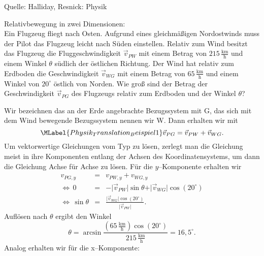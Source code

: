 \begin{MExercises}
\begin{MExercise}
\begin{enumerate}
\begin{MSolution}
      \end{MSolution}
      \end{enumerate}
      
      Quelle: Halliday, Resnick: Physik
      \end{MExercise}
      \clearpage
      
      
     \begin{MExercise} Relativbewegung in zwei Dimensionen:\\
     Ein Flugzeug fliegt nach Osten. Aufgrund eines gleichm\"a{\ss}igen Nordostwinds muss der Pilot das Flugzeug leicht nach S\"uden einstellen. Relativ zum Wind besitzt das Flugzeug die Fluggeschwindigkeit $\vec{v}_{PW}$ mit einem Betrag von $215 \,\frac{\text{km}}{\text{h}}$ und einem Winkel $\theta$ s\"udlich der \"ostlichen Richtung. Der Wind hat relativ zum Erdboden die Geschwindigkeit 
     $\vec{v}_{WG}$ mit einem Betrag von $65 \,\frac{\text{km}}{\text{h}}$ und einem Winkel von $20^{\circ}$ \"ostlich von Norden. Wie gro{\ss} sind der Betrag der Geschwindigkeit $\vec{v}_{PG}$ des Flugzeugs relativ zum Erdboden und der Winkel $\theta$?
     
     
     \begin{MSolution}  Wir bezeichnen das an der Erde angebrachte Bezugssystem mit G, das sich mit dem Wind bewegende Bezugssystem nennen wir W. Dann erhalten wir mit  
     \begin{equation}\MLabel{Physik_Translation_Beispiel1}
     \vec{v}_{PG}=\vec{v}_{PW}+\vec{v}_{WG}.
     \end{equation}Um vektorwertige Gleichungen vom Typ  zu l\"osen, zerlegt man die Gleichung meist in ihre Komponenten entlang der Achsen des Koordinatensystems, um dann die Gleichung Achse f\"ur Achse zu l\"osen. F\"ur die $y$--Komponente erhalten wir
     \begin{eqnarray*}
          v_{PG,y}&=&v_{PW,y}+v_{WG,y}\\
          \Leftrightarrow\, 0&=&-\vert\vec{v}_{PW}\vert\sin \theta+\vert\vec{v}_{WG}\vert\cos(20^{\circ})\\
          \Leftrightarrow\, \sin\theta&=&\frac{\vert\vec{v}_{WG}\vert\cos(20^{\circ})}{\vert\vec{v}_{PW}\vert}.
     \end{eqnarray*}  Auf\/l\"osen nach $\theta$ ergibt den Winkel 
          \begin{equation*}
          \theta=\arcsin\frac{(65 \,\frac{\text{km}}{\text{h}})\cos(20^{\circ})}{215 \,\frac{\text{km}}{\text{h}}}=16,5^{\circ}.
          \end{equation*}Analog erhalten wir f\"ur die x--Komponente:
           

\end{MSolution}
\end{MExercise}
\end{MExercises}

